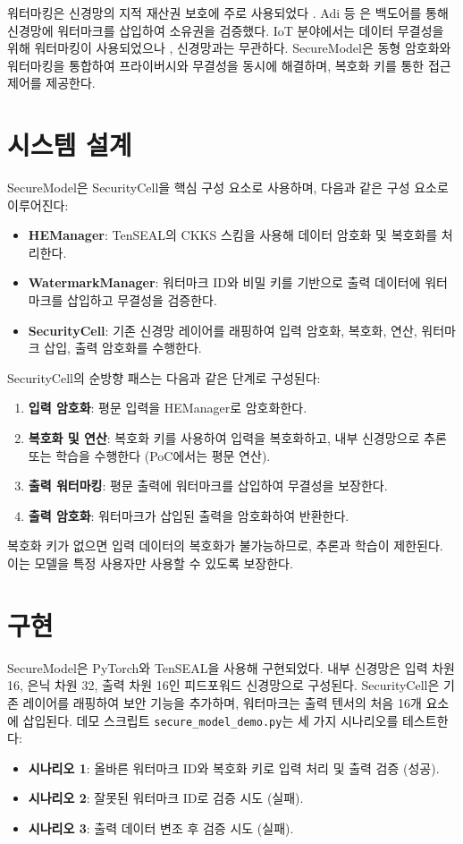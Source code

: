 \documentclass[11pt]{article}
\begin{document}
워터마킹은 신경망의 지적 재산권 보호에 주로 사용되었다 \citep{adi2018turning, zhang2018protecting}. Adi 등 \citep{adi2018turning}은 백도어를 통해 신경망에 워터마크를 삽입하여 소유권을 검증했다. IoT 분야에서는 데이터 무결성을 위해 워터마킹이 사용되었으나 \citep{li2017new}, 신경망과는 무관하다. SecureModel은 동형 암호화와 워터마킹을 통합하여 프라이버시와 무결성을 동시에 해결하며, 복호화 키를 통한 접근 제어를 제공한다.

\section{시스템 설계}
SecureModel은 SecurityCell을 핵심 구성 요소로 사용하며, 다음과 같은 구성 요소로 이루어진다:
\begin{itemize}
    \item \textbf{HEManager}: TenSEAL의 CKKS 스킴을 사용해 데이터 암호화 및 복호화를 처리한다.
    \item \textbf{WatermarkManager}: 워터마크 ID와 비밀 키를 기반으로 출력 데이터에 워터마크를 삽입하고 무결성을 검증한다.
    \item \textbf{SecurityCell}: 기존 신경망 레이어를 래핑하여 입력 암호화, 복호화, 연산, 워터마크 삽입, 출력 암호화를 수행한다.
\end{itemize}

SecurityCell의 순방향 패스는 다음과 같은 단계로 구성된다:
\begin{enumerate}
    \item \textbf{입력 암호화}: 평문 입력을 HEManager로 암호화한다.
    \item \textbf{복호화 및 연산}: 복호화 키를 사용하여 입력을 복호화하고, 내부 신경망으로 추론 또는 학습을 수행한다 (PoC에서는 평문 연산).
    \item \textbf{출력 워터마킹}: 평문 출력에 워터마크를 삽입하여 무결성을 보장한다.
    \item \textbf{출력 암호화}: 워터마크가 삽입된 출력을 암호화하여 반환한다.
\end{enumerate}

복호화 키가 없으면 입력 데이터의 복호화가 불가능하므로, 추론과 학습이 제한된다. 이는 모델을 특정 사용자만 사용할 수 있도록 보장한다.

\section{구현}
SecureModel은 PyTorch와 TenSEAL을 사용해 구현되었다. 내부 신경망은 입력 차원 16, 은닉 차원 32, 출력 차원 16인 피드포워드 신경망으로 구성된다. SecurityCell은 기존 레이어를 래핑하여 보안 기능을 추가하며, 워터마크는 출력 텐서의 처음 16개 요소에 삽입된다. 데모 스크립트 \texttt{secure\_model\_demo.py}는 세 가지 시나리오를 테스트한다:
\begin{itemize}
    \item \textbf{시나리오 1}: 올바른 워터마크 ID와 복호화 키로 입력 처리 및 출력 검증 (성공).
    \item \textbf{시나리오 2}: 잘못된 워터마크 ID로 검증 시도 (실패).
    \item \textbf{시나리오 3}: 출력 데이터 변조 후 검증 시도 (실패).
\end{itemize}
\end{document}
